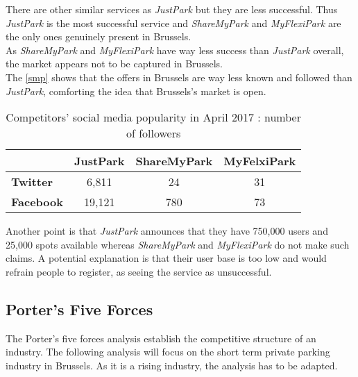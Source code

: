 \documentclass[12pt,a4paper,oneside]{book}
\begin{document}
There are other similar services as \textit{JustPark} but they are less successful. Thus \textit{JustPark} is the most successful service and \textit{ShareMyPark} and \textit{MyFlexiPark} are the only ones genuinely present in Brussels.\\

As \textit{ShareMyPark} and \textit{MyFlexiPark} have way less success than \textit{JustPark} overall, the market appears not to be captured in Brussels.\\

The \autoref{smp} shows that the offers in Brussels are way less known and followed than \textit{JustPark}, comforting the idea that Brussels's market is open.

\begin{table}[h]
\centering
\caption{Competitors' social media popularity in April 2017 : number of followers}
\label{smp}
\begin{tabular}{@{}lccc@{}}
\toprule
\textbf{}         & JustPark & ShareMyPark & MyFelxiPark \\ \midrule
\textbf{Twitter}  & 6,811    & 24          & 31          \\ \midrule
\textbf{Facebook} & 19,121   & 780         & 73          \\ \bottomrule
\end{tabular}
\end{table}

Another point is that \textit{JustPark} announces that they have 750,000 users and 25,000 spots available whereas \textit{ShareMyPark} and \textit{MyFlexiPark} do not make such claims.\cite{jpu,jpd} A potential explanation is that their user base is too low and would refrain people to register, as seeing the service as unsuccessful.



\subsection{Porter's Five Forces}
The Porter's five forces analysis establish the competitive structure of an industry. The following analysis will focus on the short term private parking industry in Brussels. As it is a rising industry, the analysis has to be adapted.\\
\end{document}
